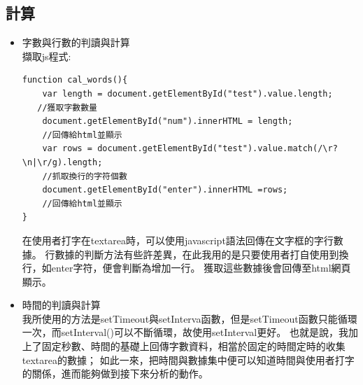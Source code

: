 \subsection{計算}
\begin{itemize}
	\item 字數與行數的判讀與計算\\
	擷取js程式:




	\medskip
\begin{lstlisting}[caption=js字數與行數的判讀與計算]
function cal_words(){
	var length = document.getElementById("test").value.length;
   //獲取字數數量
	document.getElementById("num").innerHTML = length;
	//回傳給html並顯示
	var rows = document.getElementById("test").value.match(/\r?\n|\r/g).length;
	//抓取換行的字符個數
	document.getElementById("enter").innerHTML =rows;
	//回傳給html並顯示
}
\end{lstlisting}
在使用者打字在textarea時，可以使用javascript語法回傳在文字框的字行數據。
行數據的判斷方法有些許差異，在此我用的是只要使用者打自使用到換行，如enter字符，便會判斷為增加一行。
獲取這些數據後會回傳至html網頁顯示。
\item 時間的判讀與計算\\
我所使用的方法是setTimeout與setInterva函數，但是setTimeout函數只能循環一次，而setInterval()可以不斷循環，故使用setInterval更好。\cite{name20}
也就是說，我加上了固定秒數、時間的基礎上回傳字數資料，相當於固定的時間定時的收集textarea的數據；
如此一來，把時間與數據集中便可以知道時間與使用者打字的關係，進而能夠做到接下來分析的動作。

\end{itemize}
